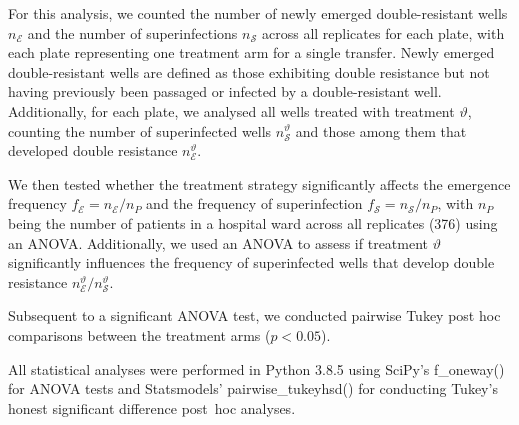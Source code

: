 For this analysis, we counted the number of newly emerged double-resistant wells \(n_{\mathcal{E}}\) and the number of superinfections \(n_{\mathcal{S}}\) across all replicates for each plate, with each plate representing one treatment arm for a single transfer. 
Newly emerged double-resistant wells are defined as those exhibiting double resistance but not having previously been passaged or infected by a double-resistant well. 
Additionally, for each plate, we analysed all wells treated with treatment \(\vartheta\), counting the number of superinfected wells \(n^{\vartheta}_{\mathcal{S}}\) and those among them that developed double resistance \(n^{\vartheta}_{\mathcal{E}}\).

We then tested whether the treatment strategy significantly affects the emergence frequency \(f_{\mathcal{E}} = n_\mathcal{E}/{n_P}\) and the frequency of superinfection \(f_{\mathcal{S}} = n_{\mathcal{S}}/{n_P}\), with \(n_P\) being the number of patients in a hospital ward across all replicates (376) using an ANOVA. 
Additionally, we used an ANOVA to assess if treatment \(\vartheta\) significantly influences the frequency of superinfected wells that develop double resistance \(n^{\vartheta}_{\mathcal{E}}/{n^{\vartheta}_{\mathcal{S}}}\).

Subsequent to a significant ANOVA test, we conducted pairwise Tukey post hoc comparisons between the treatment arms ($p < 0.05$).

All statistical analyses were performed in Python 3.8.5 using SciPy's f\_oneway() \cite{Virtanen2020} for ANOVA tests and Statsmodels' pairwise\_tukeyhsd() \cite{seabold2010statsmodels} for conducting Tukey's honest significant difference post~hoc analyses.


